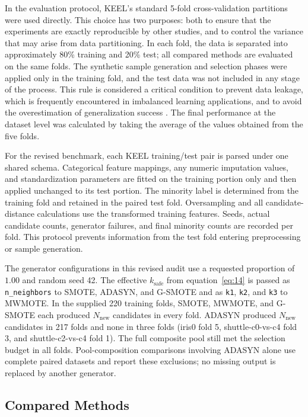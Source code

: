 \documentclass[pdflatex]{sn-jnl}
\begin{document}
In the evaluation protocol, KEEL's standard 5-fold cross-validation partitions were used directly. This choice has two purposes: both to ensure that the experiments are exactly reproducible by other studies, and to control the variance that may arise from data partitioning. In each fold, the data is separated into approximately 80\% training and 20\% test; all compared methods are evaluated on the same folds. The synthetic sample generation and selection phases were applied only in the training fold, and the test data was not included in any stage of the process. This rule is considered a critical condition to prevent data leakage, which is frequently encountered in imbalanced learning applications, and to avoid the overestimation of generalization success \cite{ref45}. The final performance at the dataset level was calculated by taking the average of the values obtained from the five folds.

For the revised benchmark, each KEEL training/test pair is parsed under one shared schema. Categorical feature mappings, any numeric imputation values, and standardization parameters are fitted on the training portion only and then applied unchanged to its test portion. The minority label is determined from the training fold and retained in the paired test fold. Oversampling and all candidate-distance calculations use the transformed training features. Seeds, actual candidate counts, generator failures, and final minority counts are recorded per fold. This protocol prevents information from the test fold entering preprocessing or sample generation.

The generator configurations in this revised audit use a requested proportion of \(1.00\) and random seed 42. The effective \(k_{\mathrm{safe}}\) from equation~\eqref{eq:14} is passed as \texttt{n\_neighbors} to SMOTE, ADASYN, and G-SMOTE and as \texttt{k1}, \texttt{k2}, and \texttt{k3} to MWMOTE. In the supplied 220 training folds, SMOTE, MWMOTE, and G-SMOTE each produced \(N_{\mathrm{new}}\) candidates in every fold. ADASYN produced \(N_{\mathrm{new}}\) candidates in 217 folds and none in three folds (iris0 fold 5, shuttle-c0-vs-c4 fold 3, and shuttle-c2-vs-c4 fold 1). The full composite pool still met the selection budget in all folds. Pool-composition comparisons involving ADASYN alone use complete paired datasets and report these exclusions; no missing output is replaced by another generator.

\subsection{Compared Methods}
\end{document}
